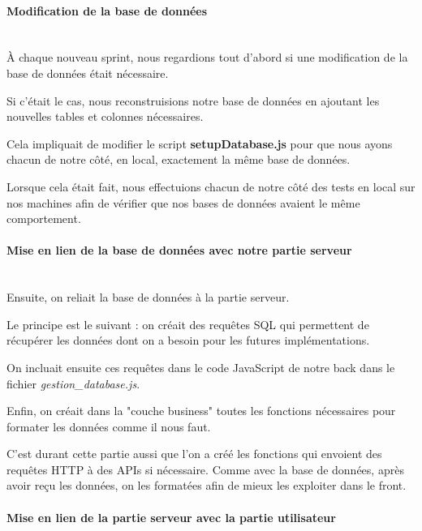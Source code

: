 \documentclass[12pt,french]{article}
\begin{document}
\paragraph{Modification de la base de données \\\\}

À chaque nouveau sprint, nous regardions tout d'abord si une modification de la base de données était nécessaire.

Si c'était le cas, nous reconstruisions notre base de données en ajoutant les nouvelles tables et colonnes nécessaires.

Cela impliquait de modifier le script \textbf{setupDatabase.js} pour que nous ayons chacun de notre côté, en local, exactement la même base de données.

Lorsque cela était fait, nous effectuions chacun de notre côté des tests en local sur nos machines afin de vérifier que nos bases de données avaient le même comportement.

\paragraph{Mise en lien de la base de données avec notre partie serveur \\\\}

Ensuite, on reliait la base de données à la partie serveur.

\medskip

Le principe est le suivant : on créait des requêtes SQL qui permettent de récupérer les données dont on a besoin pour les futures implémentations.

On incluait ensuite ces requêtes dans le code JavaScript de notre back dans le fichier \textit{gestion\_database.js}.

Enfin, on créait dans la "couche business" toutes les fonctions nécessaires pour formater les données comme il nous faut.

C'est durant cette partie aussi que l'on a créé les fonctions qui envoient des requêtes HTTP à des APIs si nécessaire. Comme avec la base de données, après avoir reçu les données, on les formatées afin de mieux les exploiter dans le front.

\paragraph{Mise en lien de la partie serveur avec la partie utilisateur \\\\}
\end{document}

